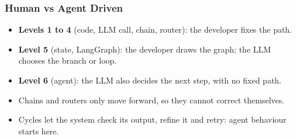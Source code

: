 \begin{frame}[fragile]\frametitle{Human vs Agent Driven}
      \begin{itemize}
        \item \textbf{Levels 1 to 4} (code, LLM call, chain, router): the developer fixes the path.
        \item \textbf{Level 5} (state, LangGraph): the developer draws the graph; the LLM chooses the branch or loop.
        \item \textbf{Level 6} (agent): the LLM also decides the next step, with no fixed path.
        \item Chains and routers only move forward, so they cannot correct themselves.
        \item Cycles let the system check its output, refine it and retry: agent behaviour starts here.
      \end{itemize}
\end{frame}
